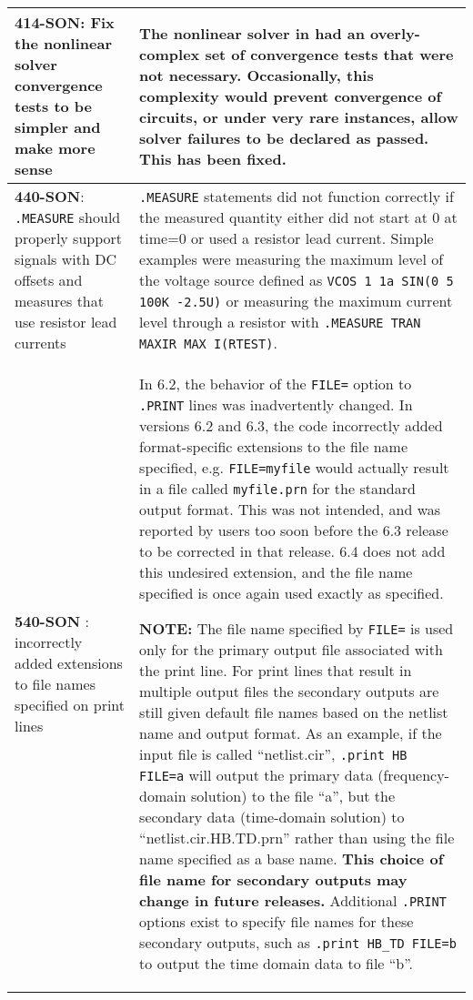 {\begin{longtable}[h] {>{\raggedright\small}m{2in}|>{\raggedright\let\\\tabularnewline\small}m{3.5in}}
     \textbf{414-SON}:  Fix the nonlinear solver convergence tests to be
     simpler and make more sense & The nonlinear solver in \Xyce{} had an
     overly-complex set of convergence tests that were not necessary.
     Occasionally, this complexity would prevent convergence of circuits, or under very
     rare instances, allow solver failures to be declared as passed.  This
     has been fixed.  
     \\ \hline 

     \textbf{440-SON}: \texttt{.MEASURE} should properly support signals with DC offsets and
     measures that use resistor lead currents & \texttt{.MEASURE} statements did not 
     function correctly if the measured quantity either did not start at 0 at time=0 or 
     used a resistor lead current.  
     Simple examples were measuring the maximum level of the voltage source defined as
     \texttt{VCOS 1 1a SIN(0 5 100K -2.5U)} or measuring the maximum current level
     through a resistor with \texttt{.MEASURE TRAN MAXIR MAX I(RTEST)}.  
     \\ \hline 

     \textbf{540-SON }: \Xyce{} incorrectly added extensions to file names
     specified on print lines & In \Xyce{} 6.2, the behavior of the
     \texttt{FILE=} option to \texttt{.PRINT} lines was inadvertently changed.
     In versions 6.2 and 6.3, the code incorrectly added format-specific
     extensions to the file name specified, e.g. \texttt{FILE=myfile} would
     actually result in a file called \texttt{myfile.prn} for the standard
     output format.  This was not intended, and was reported by users too soon
     before the 6.3 release to be corrected in that release.  \Xyce{} 6.4 does
     not add this undesired extension, and the file name specified is once
     again used exactly as specified.

     {\bf NOTE:} The file name specified by \texttt{FILE=} is used only for the
     primary output file associated with the print line.  For print lines that
     result in multiple output files the secondary outputs are still given
     default file names based on the netlist name and output format.  As an
     example, if the input file is called ``netlist.cir'', \texttt{.print HB
     FILE=a} will output the primary data (frequency-domain solution) to the
     file ``a'', but the secondary data (time-domain solution) to
     ``netlist.cir.HB.TD.prn'' rather than using the file name specified as a
     base name.  {\bf This choice of file name for secondary outputs may change
     in future releases.} Additional \texttt{.PRINT} options exist to specify
     file names for these secondary outputs, such as \texttt{.print HB\_TD
     FILE=b} to output the time domain data to file ``b''.  
     \\ \hline


\end{longtable}}

